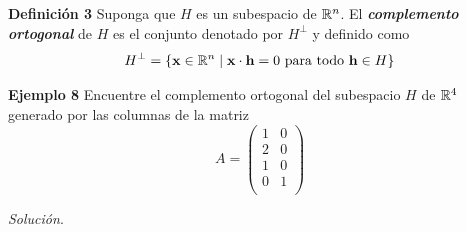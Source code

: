 
\subsection{}

\begin{frame}%

\begin{defi}{\textbf{Definición 3}}
	\justifying
	Suponga que $H$ es un subespacio de $\mathbb{R}^n$. El \textbf{\textit{complemento ortogonal}} de $H$ es el conjunto denotado
	por $H^{\perp}$ y definido como
	\[
		H^{\perp} = \{ \mathbf{x}\in\mathbb{R}^n \mid  \mathbf{x}\cdot \mathbf{h}=0 \text{ para todo } \mathbf{h}\in H \}
	\]
	
	\vspace{-1mm}
\end{defi}	

\begin{ej}{\textbf{Ejemplo 8}}\justifying 
	Encuentre el complemento ortogonal del subespacio $H$ de $\mathbb{R}^4$ generado por las columnas de la matriz
	\[
	A = 
	\left(
	\begin{array}{cc}
		1 & 0 \\[1mm]
		2 & 0 \\[1mm]
		1 & 0 \\[1mm]
		0 & 1 \\[1mm]
	\end{array}
	\right)
	\]
\end{ej}
\textit{Solución}.

\end{frame}


\subsection{}

